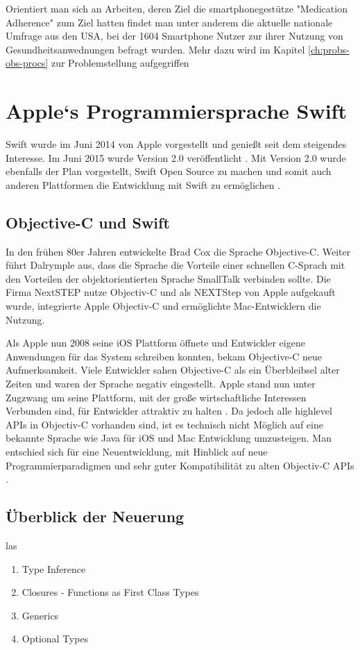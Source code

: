 Orientiert man sich an Arbeiten, deren Ziel die smartphonegestütze "Medication Adherence" zum Ziel hatten findet man unter anderem die aktuelle nationale Umfrage \cite{Krebs-P:2015aa} aus den USA, bei der 1604 Smartphone Nutzer zur ihrer Nutzung von Gesundheitsanwednungen befragt wurden. Mehr dazu wird im Kapitel \ref{ch:probs-obs-procs} zur Problemstellung  aufgegriffen
\section{Apple`s Programmiersprache Swift}
Swift wurde im Juni 2014 von Apple vorgestellt und genießt seit dem steigendes Interesse. Im Juni 2015 wurde Version 2.0 veröffentlicht \cite{Apple:2014sp}. Mit Version 2.0 wurde ebenfalls der Plan vorgestellt, Swift Open Source zu machen und somit auch anderen Plattformen die Entwicklung mit Swift zu ermöglichen \cite{Apple:2014sp}.

\subsection{Objective-C und Swift}
In den frühen 80er Jahren entwickelte Brad Cox die Sprache Objective-C\cite{Dalrymple:2009aa}. Weiter führt Dalrymple aus, dass die Sprache  die Vorteile einer schnellen C-Sprach mit den Vorteilen der objektorientierten Sprache SmallTalk verbinden sollte. Die Firma NextSTEP nutze Objectiv-C und als NEXTStep von Apple aufgekauft wurde, integrierte Apple Objectiv-C und ermöglichte Mac-Entwicklern die Nutzung.

 Als Apple nun 2008 seine iOS Plattform öffnete und Entwickler eigene Anwendungen für das System schreiben konnten, bekam Objective-C neue Aufmerksamkeit. Viele Entwickler sahen Objective-C als ein Überbleibsel alter Zeiten und waren der Sprache negativ eingestellt. Apple stand nun unter Zugzwang um seine Plattform, mit der große wirtschaftliche Interessen Verbunden sind, für Entwickler attraktiv zu halten \cite{Wells:2015fu}. Da jedoch alle highlevel APIs in Objectiv-C vorhanden sind, ist es technisch nicht Möglich auf eine bekannte Sprache wie Java für iOS und Mac Entwicklung umzusteigen. Man entschied sich für eine Neuentwicklung, mit Hinblick auf neue Programmierparadigmen und sehr guter Kompatibilität zu alten Objectiv-C APIs \cite{Wells:2015fu}.

\subsection{Überblick der Neuerung}
las\begin{enumerate}
\item Type Inference
\item Closures - Functions as First Class Types
\item Generics
\item Optional Types
\end{enumerate}

